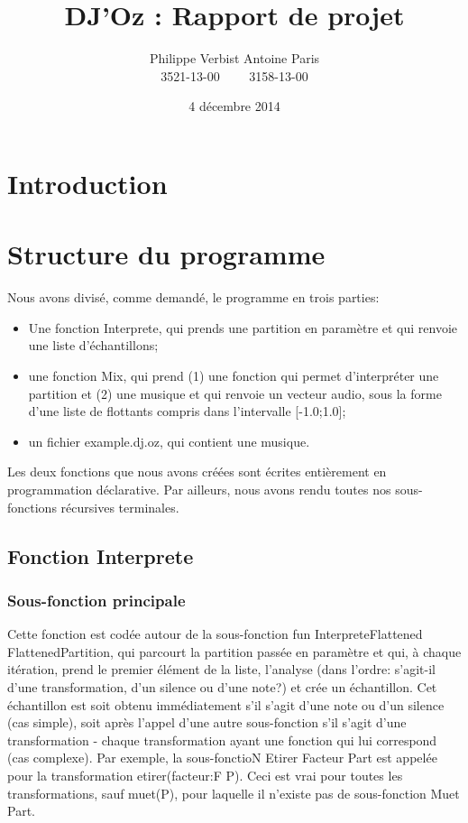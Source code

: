 \documentclass[12pt,a4paper]{article}
\author{Philippe Verbist  Antoine Paris\\3521-13-00 \ \ \ \ 3158-13-00}
\title{DJ'Oz : Rapport de projet}
\date{4 décembre 2014}
\begin{document}
\maketitle

\section{Introduction}

\section{Structure du programme}

Nous avons divisé, comme demandé, le programme en trois parties:
\begin{itemize}
	\item Une fonction Interprete, qui prends une partition en 	paramètre et qui renvoie une liste d'échantillons;
	\item une fonction Mix, qui prend (1) une fonction qui permet d'interpréter une partition  et (2) une musique et qui renvoie un vecteur audio, sous la forme d'une liste de flottants compris dans l'intervalle [-1.0;1.0];
	\item un fichier example.dj.oz, qui contient une musique.
\end{itemize}

Les deux fonctions que nous avons créées sont écrites entièrement en programmation déclarative. Par ailleurs, nous avons rendu toutes nos sous-fonctions récursives terminales.

\subsection{Fonction Interprete}
\subsubsection{Sous-fonction principale}
Cette fonction est codée autour de la sous-fonction fun {InterpreteFlattened FlattenedPartition},
 qui parcourt la partition passée en paramètre et qui, à chaque itération, prend le premier
élément de la liste, l'analyse (dans l'ordre: s'agit-il d'une transformation, d'un silence ou d'une note?)
 et crée un échantillon. Cet échantillon est soit obtenu immédiatement s'il s'agit d'une note ou d'un
silence (cas simple), soit après l'appel d'une autre sous-fonction s'il s'agit d'une transformation -
chaque transformation ayant une fonction qui lui correspond (cas complexe). Par exemple, la sous-fonctioN
{Etirer Facteur Part} est appelée pour la transformation etirer(facteur:F P). Ceci est vrai pour toutes
les transformations, sauf muet(P), pour laquelle il n'existe pas de sous-fonction {Muet Part}.
\end{document}
